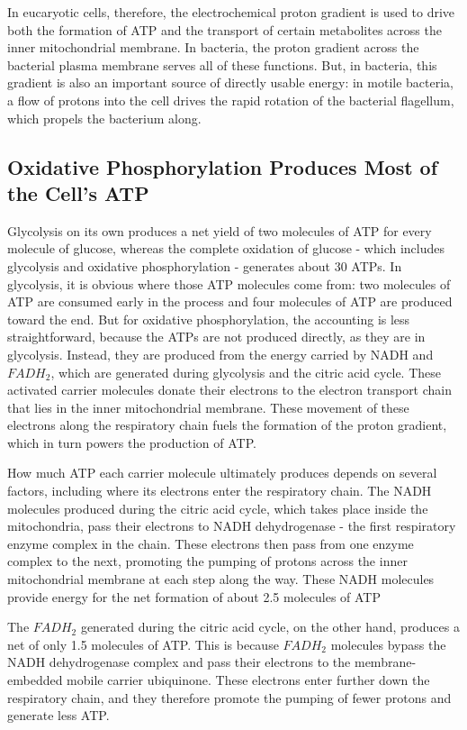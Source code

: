In eucaryotic cells, therefore, the electrochemical proton gradient is used
to drive both the formation of ATP and the transport of certain metabolites
across the inner mitochondrial membrane. In bacteria, the proton
gradient across the bacterial plasma membrane serves all of these functions.
But, in bacteria, this gradient is also an important source of directly
usable energy: in motile bacteria, a flow of protons into the cell drives
the rapid rotation of the bacterial flagellum, which propels the bacterium
along.

\subsection{Oxidative Phosphorylation Produces Most of the Cell’s ATP}

Glycolysis on its own produces a net yield of two
molecules of ATP for every molecule of glucose, whereas the complete
oxidation of glucose - which includes glycolysis and oxidative
phosphorylation - generates about 30 ATPs. In glycolysis, it is obvious where those
ATP molecules come from: two molecules of ATP are consumed early
in the process and four molecules of ATP are produced toward the end.
But for oxidative phosphorylation, the accounting is
less straightforward, because the ATPs are not produced directly, as they
are in glycolysis. Instead, they are produced from the energy carried by
NADH and $FADH_2$, which are generated during glycolysis and the citric
acid cycle. These activated carrier molecules donate their electrons to the
electron transport chain that lies in the inner mitochondrial membrane.
These movement of these electrons along the respiratory chain fuels the
formation of the proton gradient, which in turn powers the production of
ATP.

How much ATP each carrier molecule ultimately produces depends on
several factors, including where its electrons enter the respiratory chain.
The NADH molecules produced during the citric acid cycle, which takes
place inside the mitochondria, pass their electrons to NADH dehydrogenase -
the first respiratory enzyme complex in the chain. These electrons
then pass from one enzyme complex to the next, promoting the pumping
of protons across the inner mitochondrial membrane at each step along
the way. These NADH molecules provide energy for the net formation of
about 2.5 molecules of ATP

The $FADH_2$ generated during the citric acid cycle, on the other hand,
produces a net of only 1.5 molecules of ATP. This is because $FADH_2$ molecules
bypass the NADH dehydrogenase complex and pass their electrons
to the membrane-embedded mobile carrier ubiquinone.
These electrons enter further down the respiratory chain, and they therefore
promote the pumping of fewer protons and generate less ATP.

